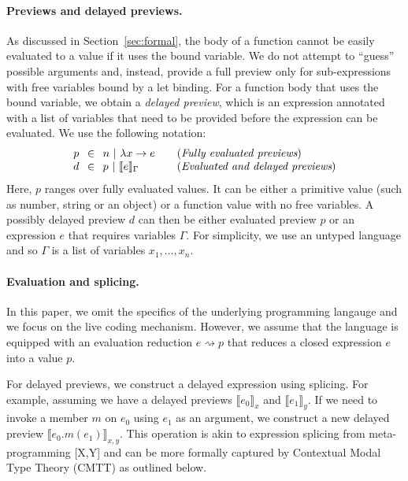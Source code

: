 \documentclass[sigplan,10pt]{acmart}\settopmatter{printfolios=true,printccs=false,printacmref=false}
\theoremstyle{plain}
\theoremstyle{definition}
\begin{document}
\paragraph{Previews and delayed previews.}
As discussed in Section~\ref{sec:formal}, the body of a function cannot be easily evaluated to
a value if it uses the bound variable. We do not attempt to ``guess'' possible arguments and,
instead, provide a full preview only for sub-expressions with free variables bound by a let binding.
For a function body that uses the bound variable, we obtain a \emph{delayed preview}, which is
an expression annotated with a list of variables that need to be provided before the expression
can be evaluated. We use the following notation:
%
\begin{equation*}
\begin{array}{rcll}
p&\hspace{-0.25em}\in\hspace{-0.25em}&n~|~\lambda x\rightarrow e&\quad(\textit{Fully evaluated previews})\\
d&\hspace{-0.25em}\in\hspace{-0.25em}&p~|~\llbracket e \rrbracket_\Gamma&\quad(\textit{Evaluated and delayed previews})\\
\end{array}
\end{equation*}
%
Here, $p$ ranges over fully evaluated values. It can be either a primitive value (such as number,
string or an object) or a function value with no free variables. A possibly delayed preview $d$ 
can then be either evaluated preview $p$ or an expression $e$ that requires variables $\Gamma$.
For simplicity, we use an untyped language and so $\Gamma$ is a list of variables $x_1, \ldots, x_n$.

\paragraph{Evaluation and splicing.}
In this paper, we omit the specifics of the underlying programming langauge and we focus on the
live coding mechanism. However, we assume that the language is equipped with an evaluation 
reduction $e \rightsquigarrow p$ that reduces a closed expression $e$ into a value $p$.

For delayed previews, we construct a delayed expression using splicing. For example, assuming
we have a delayed previews $\llbracket e_0 \rrbracket_x$ and $\llbracket e_1 \rrbracket_y$. 
If we need to invoke a member $m$ on $e_0$ using $e_1$ as an argument, we construct a new 
delayed preview $\llbracket e_0.m(e_1) \rrbracket_{x, y}$. This operation is akin to expression
splicing from meta-programming [X,Y] and can be more formally captured by Contextual Modal Type 
Theory (CMTT) as outlined below.
\end{document}

